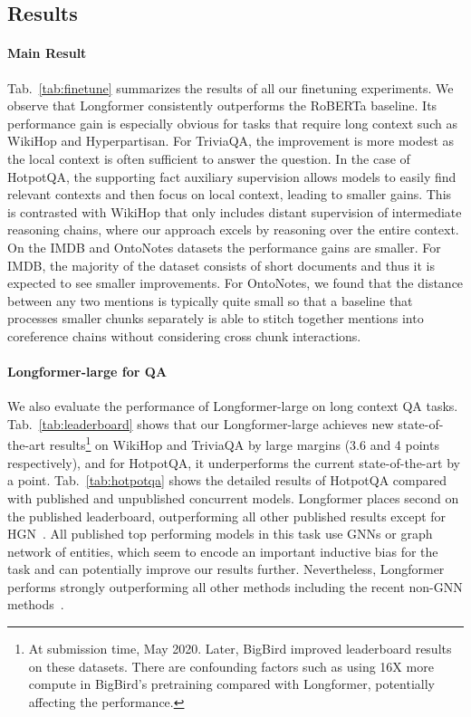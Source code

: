 \documentclass[11pt,a4paper]{article}
\newcommand{\model}{Longformer\xspace}
\begin{document}
\subsection{Results}

\paragraph{Main Result}
Tab.~\ref{tab:finetune} summarizes the results of all our finetuning experiments. We observe that \model consistently outperforms the RoBERTa baseline. 
Its performance gain is especially obvious for tasks that require long context such as WikiHop and Hyperpartisan.
For TriviaQA, the improvement is more modest as the local context is often sufficient to answer the question.
In the case of HotpotQA, the supporting fact auxiliary supervision allows models to easily find relevant contexts and then focus on local context, leading to smaller gains.  This is contrasted with WikiHop that only includes distant supervision of intermediate reasoning chains, where our approach excels by reasoning over the entire context.
On the IMDB and OntoNotes datasets the performance gains are smaller. For IMDB, the majority of the dataset consists of short documents and thus it is expected to see smaller improvements.
For OntoNotes, we found that the distance between any two mentions is typically quite small so that a baseline that processes smaller chunks separately is able to stitch together mentions into coreference chains without considering cross chunk interactions.

\paragraph{\model-large for QA}
We also evaluate the performance of \model-large on long context QA tasks. Tab.~\ref{tab:leaderboard}
shows that our \model-large achieves new state-of-the-art
results\footnote{At submission time, May 2020. Later, BigBird \cite{Zaheer2020BigBT} improved leaderboard results on these datasets. There are confounding factors such as using 16X more compute in BigBird's pretraining compared with Longformer, potentially affecting the performance.} on WikiHop and TriviaQA by large margins (3.6 and 4 points respectively), and for HotpotQA, it underperforms the current state-of-the-art \cite{hotpotqasota} by a point.
Tab.~\ref{tab:hotpotqa} shows the detailed results of HotpotQA compared with published and unpublished concurrent models. \model places second on the published leaderboard, outperforming all other published results except for HGN~\cite{hotpotqasota}. All published top performing models in this task \cite{Tu2019SelectAA,hotpotqasota,Shao2020IsGS} use GNNs \cite{kipf2017semi} or graph network of entities, which seem to encode an important inductive bias for the task and can potentially improve our results further. 
Nevertheless, \model performs strongly outperforming all other methods including the recent non-GNN methods~\cite{Gla2019SpanSP,Shao2020IsGS,quark2020}.
\end{document}
